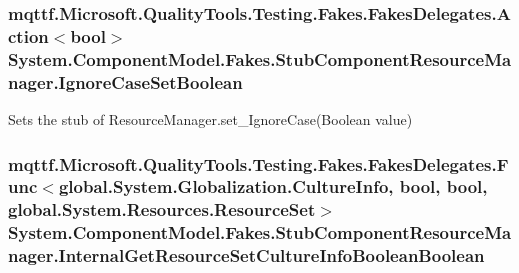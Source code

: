 \hypertarget{class_system_1_1_component_model_1_1_fakes_1_1_stub_component_resource_manager_a966ad31333709f1430f9955960fd6aba}{
\subsubsection[{Ignore\-Case\-Set\-Boolean}]{\setlength{\rightskip}{0pt plus 5cm}mqttf.\-Microsoft.\-Quality\-Tools.\-Testing.\-Fakes.\-Fakes\-Delegates.\-Action$<$bool$>$ System.\-Component\-Model.\-Fakes.\-Stub\-Component\-Resource\-Manager.\-Ignore\-Case\-Set\-Boolean}}\label{class_system_1_1_component_model_1_1_fakes_1_1_stub_component_resource_manager_a966ad31333709f1430f9955960fd6aba}


Sets the stub of Resource\-Manager.\-set\-\_\-\-Ignore\-Case(\-Boolean value)

\hypertarget{class_system_1_1_component_model_1_1_fakes_1_1_stub_component_resource_manager_ae534b1ca7a6d959bf776ac0206db4435}{
\subsubsection[{Internal\-Get\-Resource\-Set\-Culture\-Info\-Boolean\-Boolean}]{\setlength{\rightskip}{0pt plus 5cm}mqttf.\-Microsoft.\-Quality\-Tools.\-Testing.\-Fakes.\-Fakes\-Delegates.\-Func$<$global.\-System.\-Globalization.\-Culture\-Info, bool, bool, global.\-System.\-Resources.\-Resource\-Set$>$ System.\-Component\-Model.\-Fakes.\-Stub\-Component\-Resource\-Manager.\-Internal\-Get\-Resource\-Set\-Culture\-Info\-Boolean\-Boolean}}\label{class_system_1_1_component_model_1_1_fakes_1_1_stub_component_resource_manager_ae534b1ca7a6d959bf776ac0206db4435}


